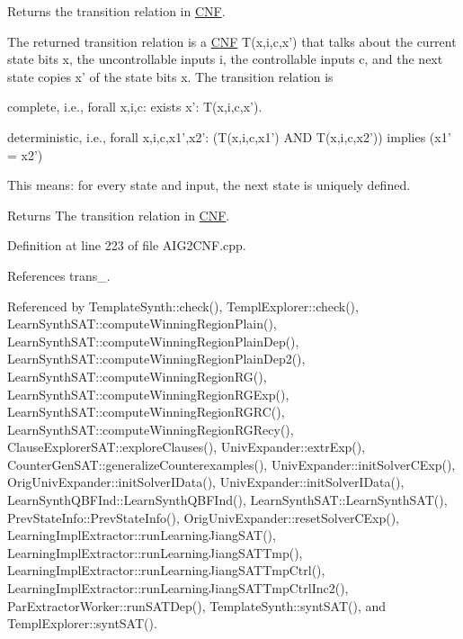 Returns the transition relation in \hyperlink{classCNF}{C\-N\-F}. 

The returned transition relation is a \hyperlink{classCNF}{C\-N\-F} T(x,i,c,x') that talks about the current state bits x, the uncontrollable inputs i, the controllable inputs c, and the next state copies x' of the state bits x. The transition relation is 
\begin{DoxyItemize}
\item complete, i.\-e., forall x,i,c\-: exists x'\-: T(x,i,c,x'). 
\item deterministic, i.\-e., forall x,i,c,x1',x2'\-: (T(x,i,c,x1') A\-N\-D T(x,i,c,x2')) implies (x1' = x2') 
\end{DoxyItemize}This means\-: for every state and input, the next state is uniquely defined.

\begin{DoxyReturn}{Returns}
The transition relation in \hyperlink{classCNF}{C\-N\-F}. 
\end{DoxyReturn}


Definition at line 223 of file A\-I\-G2\-C\-N\-F.\-cpp.



References trans\-\_\-.



Referenced by Template\-Synth\-::check(), Templ\-Explorer\-::check(), Learn\-Synth\-S\-A\-T\-::compute\-Winning\-Region\-Plain(), Learn\-Synth\-S\-A\-T\-::compute\-Winning\-Region\-Plain\-Dep(), Learn\-Synth\-S\-A\-T\-::compute\-Winning\-Region\-Plain\-Dep2(), Learn\-Synth\-S\-A\-T\-::compute\-Winning\-Region\-R\-G(), Learn\-Synth\-S\-A\-T\-::compute\-Winning\-Region\-R\-G\-Exp(), Learn\-Synth\-S\-A\-T\-::compute\-Winning\-Region\-R\-G\-R\-C(), Learn\-Synth\-S\-A\-T\-::compute\-Winning\-Region\-R\-G\-Recy(), Clause\-Explorer\-S\-A\-T\-::explore\-Clauses(), Univ\-Expander\-::extr\-Exp(), Counter\-Gen\-S\-A\-T\-::generalize\-Counterexamples(), Univ\-Expander\-::init\-Solver\-C\-Exp(), Orig\-Univ\-Expander\-::init\-Solver\-I\-Data(), Univ\-Expander\-::init\-Solver\-I\-Data(), Learn\-Synth\-Q\-B\-F\-Ind\-::\-Learn\-Synth\-Q\-B\-F\-Ind(), Learn\-Synth\-S\-A\-T\-::\-Learn\-Synth\-S\-A\-T(), Prev\-State\-Info\-::\-Prev\-State\-Info(), Orig\-Univ\-Expander\-::reset\-Solver\-C\-Exp(), Learning\-Impl\-Extractor\-::run\-Learning\-Jiang\-S\-A\-T(), Learning\-Impl\-Extractor\-::run\-Learning\-Jiang\-S\-A\-T\-Tmp(), Learning\-Impl\-Extractor\-::run\-Learning\-Jiang\-S\-A\-T\-Tmp\-Ctrl(), Learning\-Impl\-Extractor\-::run\-Learning\-Jiang\-S\-A\-T\-Tmp\-Ctrl\-Inc2(), Par\-Extractor\-Worker\-::run\-S\-A\-T\-Dep(), Template\-Synth\-::synt\-S\-A\-T(), and Templ\-Explorer\-::synt\-S\-A\-T().

